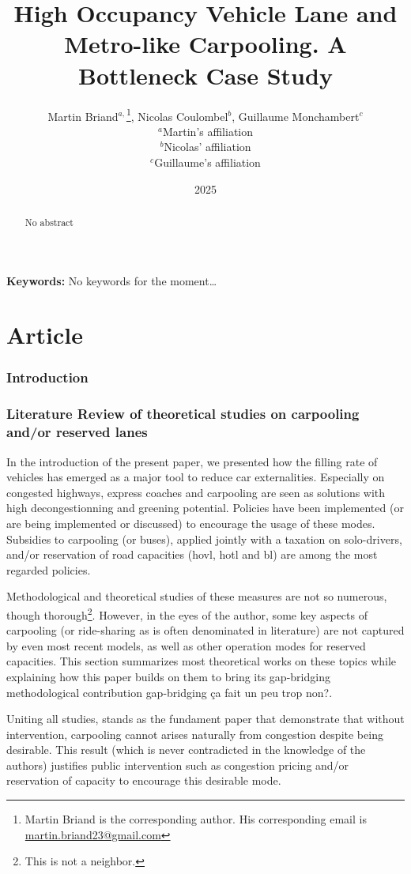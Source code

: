 \documentclass[english, a4paper]{article}
\title{High Occupancy Vehicle Lane and Metro-like Carpooling. A Bottleneck Case Study}
\author{Martin Briand$^{a,}$\footnote{Martin Briand is the corresponding author. His corresponding email is \href{mailto:martin.briand23@gmail.com}{martin.briand23@gmail.com}}, Nicolas Coulombel$^{b}$, Guillaume Monchambert$^{c}$\\
\small $^{a}$Martin’s affiliation\\
\small $^{b}$Nicolas’ affiliation\\
\small $^{c}$Guillaume’s affiliation}
\date{2025}
\theoremstyle{plain}
\theoremstyle{definition}
\theoremstyle{remark}
\newcommand{\keywords}[1]
{
    \small
    \textbf{Keywords:} #1
    \vspace{0.2cm}
}
\begin{document}
\maketitle

\begin{abstract}
    No abstract
\end{abstract}

\keywords{No keywords for the moment…}


\clearpage
\part{Article}


\section{Introduction}

\section{Literature Review of theoretical studies on carpooling and/or reserved lanes}

In the introduction of the present paper, we presented how the filling rate of vehicles has emerged as a major tool to reduce car externalities. Especially on congested highways, express coaches and carpooling are seen as solutions with high decongestionning and greening potential. Policies have been implemented (or are being implemented or discussed) to encourage the usage of these modes. Subsidies to carpooling (or buses), applied jointly with a taxation on solo-drivers, and/or reservation of road capacities (\acrshort{hovl}, \acrshort{hotl} and \acrshort{bl}) are among the most regarded policies.

Methodological and theoretical studies of these measures are not so numerous, though thorough\footnote{\alert{This is not a neighbor.}}. However, in the eyes of the author, some key aspects of carpooling (or ride-sharing as is often denominated in literature) are not captured by even most recent models, as well as other operation modes for reserved capacities. This section summarizes most theoretical works on these topics while explaining how this paper builds on them to bring its gap-bridging methodological contribution \alert{gap-bridging ça fait un peu trop non?}.

Uniting all studies, \cite{huang_models_2000} stands as the fundament paper that demonstrate that without intervention, carpooling cannot arises naturally from congestion despite being desirable. This result (which is never contradicted in the knowledge of the authors) justifies public intervention such as congestion pricing and/or reservation of capacity to encourage this desirable mode.
\end{document}
